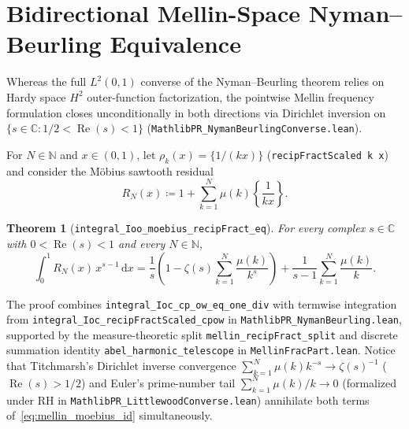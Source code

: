 \documentclass[11pt,a4paper]{article}
\newtheorem{theorem}{Theorem}[section]
\theoremstyle{definition}
\newcommand{\dee}{\mathrm{d}}
\newcommand{\Nset}{\mathbb{N}}
\newcommand{\Cfield}{\mathbb{C}}
\begin{document}
\section{Bidirectional Mellin-Space Nyman--Beurling Equivalence}\label{sec:mellin_converse}

Whereas the full $L^2(0,1)$ converse of the Nyman--Beurling theorem relies on Hardy space $H^2$ outer-function factorization, the pointwise Mellin frequency formulation closes unconditionally in both directions via Dirichlet inversion on $\{s \in \Cfield : 1/2 < \operatorname{Re}(s) < 1\}$ (\texttt{MathlibPR\_\allowbreak NymanBeurlingConverse.lean}).

For $N \in \Nset$ and $x \in (0, 1)$, let $\rho_k(x) = \{1/(kx)\}$ (\texttt{recipFractScaled k x}) and consider the M\"obius sawtooth residual
\begin{equation}
R_N(x) \coloneqq 1 + \sum_{k=1}^N \mu(k) \left\{ \frac{1}{kx} \right\}.
\end{equation}

\begin{theorem}[\texttt{integral\_\allowbreak Ioo\_\allowbreak moebius\_\allowbreak recipFract\_\allowbreak eq}]\label{thm:mellin_residual_exact}
For every complex $s \in \Cfield$ with $0 < \operatorname{Re}(s) < 1$ and every $N \in \Nset$,
\begin{equation}\label{eq:mellin_moebius_id}
\int_0^1 R_N(x)\, x^{s-1}\,\dee x = \frac{1}{s}\!\left(1 - \zeta(s)\sum_{k=1}^N \frac{\mu(k)}{k^s}\right) + \frac{1}{s - 1}\sum_{k=1}^N \frac{\mu(k)}{k}.
\end{equation}
\end{theorem}

The proof combines \texttt{integral\_\allowbreak Ioc\_\allowbreak cp\_\allowbreak ow\_\allowbreak eq\_\allowbreak one\_\allowbreak div} with termwise integration from \texttt{integral\_\allowbreak Ioc\_\allowbreak recipFractScaled\_\allowbreak cpow} in \texttt{MathlibPR\_\allowbreak NymanBeurling.lean}, supported by the measure-theoretic split \texttt{mellin\_\allowbreak recipFract\_\allowbreak split} and discrete summation identity \texttt{abel\_\allowbreak harmonic\_\allowbreak telescope} in \texttt{MellinFracPart.lean}. Notice that Titchmarsh's Dirichlet inverse convergence $\sum_{k=1}^N \mu(k) k^{-s} \to \zeta(s)^{-1}$ ($\operatorname{Re}(s) > 1/2$) and Euler's prime-number tail $\sum_{k=1}^N \mu(k)/k \to 0$ (formalized under RH in \texttt{MathlibPR\_\allowbreak LittlewoodConverse.lean}) annihilate both terms of~\eqref{eq:mellin_moebius_id} simultaneously.
\end{document}
